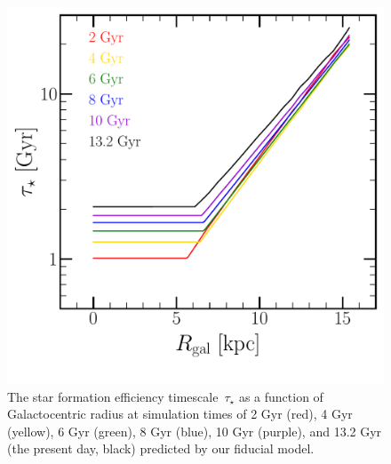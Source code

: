 \begin{figure} 
\centering 
\includegraphics[scale = 0.45]{sfe.pdf} 
\caption{The star formation efficiency timescale~$\tau_\star$ as a function of 
Galactocentric radius at simulation times of 2 Gyr (red), 4 Gyr (yellow), 
6 Gyr (green), 8 Gyr (blue), 10 Gyr (purple), and 13.2 Gyr (the present day, 
black) predicted by our fiducial model. } 
\label{migration:fig:sfe} 
\end{figure} 

